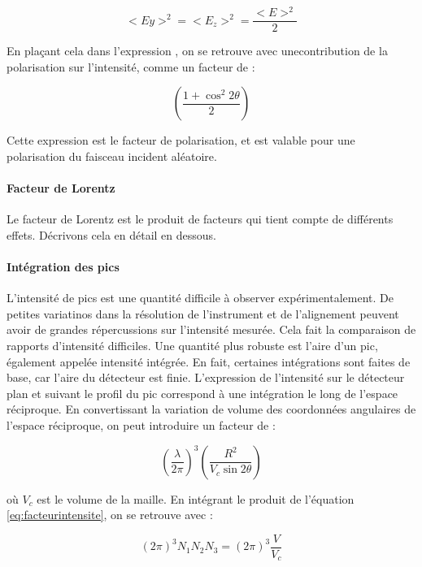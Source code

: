 \begin{equation}
    <Ey>^2 = <E_z>^2 = \frac{<E>^2}{2}
\end{equation}

En plaçant cela dans l'expression \label{eq:champincid}, on se retrouve avec unecontribution de la polarisation sur l'intensité, comme un facteur de :

\begin{equation}
    \left( \frac{1+\cos^2 2\theta}{2} \right)
\end{equation}

Cette expression est le facteur de polarisation, et est valable pour une polarisation du faisceau incident aléatoire.

\paragraph{Facteur de Lorentz}

Le facteur de Lorentz est le produit de facteurs qui tient compte de différents effets. Décrivons cela en détail en dessous.

\paragraph{Intégration des pics}

L'intensité de pics est une quantité difficile à observer expérimentalement. De petites variatinos dans la résolution de l'instrument et de l'alignement peuvent avoir de grandes répercussions sur l'intensité mesurée. Cela fait la comparaison de rapports d'intensité difficiles. Une quantité plus robuste est l'aire d'un pic, également appelée intensité intégrée. En fait, certaines intégrations sont faites de base, car l'aire du détecteur est finie. L'expression de l'intensité sur le détecteur plan et suivant le profil du pic correspond à une intégration le long de l'espace réciproque. En convertissant la variation de volume des coordonnées angulaires de l'espace réciproque, on peut introduire un facteur de :

\begin{equation}
    \left(\frac{\lambda}{2\pi} \right)^3 \left( \frac{R^2}{V_c \sin 2\theta} \right)
    \label{eq:integ1}
\end{equation}

où $V_c$ est le volume de la maille. En intégrant le produit de l'équation \ref{eq:facteurintensite}, on se retrouve avec :

\begin{equation}
    (2\pi)^3 N_1N_2N_3 = (2\pi)^3 \frac{V}{V_c}
    \label{eq:integration}
\end{equation}

